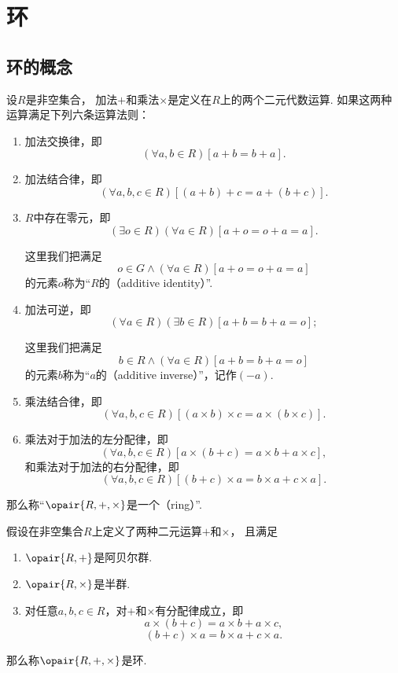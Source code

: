 \section{环}
\subsection{环的概念}
\begin{definition}\label{definition:抽象代数.环的定义}
设\(R\)是非空集合，
加法\(+\)和乘法\(\times\)是定义在\(R\)上的两个二元代数运算.
如果这两种运算满足下列六条运算法则：
\begin{enumerate}
    \item 加法交换律，即\[
        (\forall a,b \in R)[a+b = b+a].
    \]

    \item 加法结合律，即\[
        (\forall a,b,c \in R)[(a+b)+c = a+(b+c)].
    \]

    \item \(R\)中存在零元，即\[
        (\exists o \in R)(\forall a \in R)[a+o = o+a = a].
    \]

	这里我们把满足\[
		o \in G
		\land
		(\forall a \in R)[a+o = o+a = a]
	\]的元素\(o\)称为“\(R\)的（additive identity）”.

    \item 加法可逆，即\[
        (\forall a \in R)(\exists b \in R)[a+b = b+a = o];
    \]

	这里我们把满足\[
		b \in R
		\land
        (\forall a \in R)[a+b = b+a = o]
	\]的元素\(b\)称为“\(a\)的（additive inverse）”，记作\((-a)\).

    \item 乘法结合律，即\[
        (\forall a,b,c \in R)
        [ (a \times b) \times c = a \times (b \times c) ].
    \]

    \item 乘法对于加法的左分配律，即\[
        (\forall a,b,c \in R)[ a \times (b+c) = a \times b + a \times c ],
    \]
    和乘法对于加法的右分配律，即\[
        (\forall a,b,c \in R)[ (b+c) \times a = b \times a + c \times a ].
    \]
\end{enumerate}
那么称“\(\opair{R,+,\times}\)是一个（ring）”.
\end{definition}

\begin{theorem}
假设在非空集合\(R\)上定义了两种二元运算\(+\)和\(\times\)，
且满足\begin{enumerate}
	\item \(\opair{R,+}\)是阿贝尔群.

	\item \(\opair{R,\times}\)是半群.

	\item 对任意\(a,b,c \in R\)，对\(+\)和\(\times\)有分配律成立，即\[
		a \times (b + c) = a \times b + a \times c,
	\]\[
		(b + c) \times a = b \times a + c \times a.
	\]
\end{enumerate}
那么称\(\opair{R,+,\times}\)是环.
\end{theorem}

